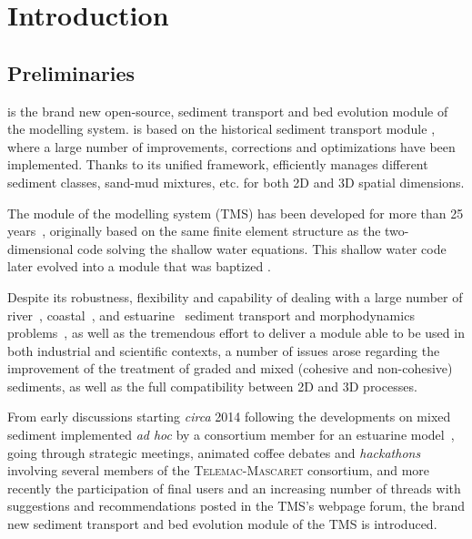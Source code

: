 \chapter[Introduction]{Introduction}

\section{Preliminaries}
\gaia{} is the brand new open-source, sediment transport and bed evolution module of the \telemacsystem{} modelling system. \gaia{} is based on the historical sediment transport module \sisyphe{}, where a large number of improvements, corrections and optimizations have been implemented. Thanks to its unified framework, \gaia{} efficiently manages different sediment classes, sand-mud mixtures, etc. for both 2D and 3D spatial dimensions.

The module \sisyphe{} of the \telemacsystem{} modelling system (\textsc{TMS}) has been developed for more than 25 years~\cite{Sisyphe1.0}, originally based on the same finite element structure as the two-dimensional code solving the shallow water equations. This shallow water code later evolved into a module that was baptized .

Despite its robustness, flexibility and capability of dealing with a large number of river~\cite{ctccrp19,dwtg17}, coastal~\cite{BROWN20091502,ROBINS2014311,10.2307/40928823}, and estuarine~\cite{sfth,sfth17,doi:10.1061/(ASCE)0733-950X(2009)135:4(176)} sediment transport and morphodynamics problems~\cite{VILLARET2013105}, as well as the tremendous effort to deliver a module able to be used in both industrial and scientific contexts, a number of issues arose regarding the improvement of the treatment of graded and mixed (cohesive and non-cohesive) sediments, as well as the full compatibility between 2D and 3D processes.

From early discussions starting \textit{circa} 2014 following the developments on mixed sediment implemented \textit{ad hoc} by a consortium member for an estuarine model~\cite{deLinares}, going through strategic meetings, animated coffee debates and \textit{hackathons} involving several members of the \textsc{Telemac-Mascaret} consortium, and more recently the participation of final users and an increasing number of threads with suggestions and recommendations posted in the \textsc{TMS}'s webpage forum, the brand new sediment transport and bed evolution module \gaia{} of the \textsc{TMS} is introduced.

